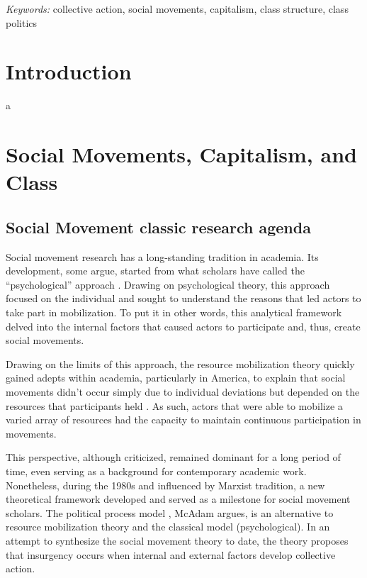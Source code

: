 \documentclass[12pt]{article}
\begin{document}
\noindent%
{\it Keywords:} collective action, social movements, capitalism, class
structure, class politics

\vfill

\newpage
{} %

\hypertarget{introduction}{%
\section{Introduction}\label{introduction}}

a

\hypertarget{social-movements-capitalism-and-class}{%
\section{Social Movements, Capitalism, and
Class}\label{social-movements-capitalism-and-class}}

\hypertarget{social-movement-classic-research-agenda}{%
\subsection{Social Movement classic research
agenda}\label{social-movement-classic-research-agenda}}

Social movement research has a long-standing tradition in academia. Its
development, some argue, started from what scholars have called the
``psychological'' approach \citep{eidlinSocialClassSocial2018}. Drawing
on psychological theory, this approach focused on the individual and
sought to understand the reasons that led actors to take part in
mobilization. To put it in other words, this analytical framework delved
into the internal factors that caused actors to participate and, thus,
create social movements.

Drawing on the limits of this approach, the resource mobilization theory
quickly gained adepts within academia, particularly in America, to
explain that social movements didn't occur simply due to individual
deviations but depended on the resources that participants held
\citep{mccarthyResourceMobilizationSocial1977}. As such, actors that
were able to mobilize a varied array of resources had the capacity to
maintain continuous participation in movements.

This perspective, although criticized, remained dominant for a long
period of time, even serving as a background for contemporary academic
work. Nonetheless, during the 1980s and influenced by Marxist tradition,
a new theoretical framework developed and served as a milestone for
social movement scholars. The political process model
\citep{mcadamPoliticalProcessDevelopment1999}, McAdam argues, is an
alternative to resource mobilization theory and the classical model
(psychological). In an attempt to synthesize the social movement theory
to date, the theory proposes that insurgency occurs when internal and
external factors develop collective action.
\end{document}
